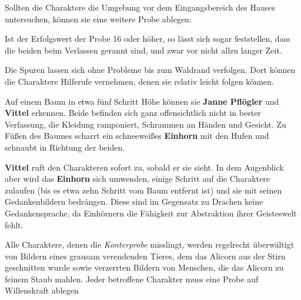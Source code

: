 Sollten die Charaktere die Umgebung vor dem Eingangsbereich des Hauses untersuchen, können sie eine weitere Probe ablegen:

Ist der Erfolgswert der Probe 16 oder höher, so lässt sich sogar feststellen, dass die beiden beim Verlassen gerannt sind, und zwar vor nicht allzu langer Zeit.

Die Spuren lassen sich ohne Probleme bis zum Waldrand verfolgen. Dort können die Charaktere Hilferufe vernehmen, denen sie relativ leicht folgen können.
\begin{center}
\end{center}

\neuespalte

Auf einem Baum in etwa fünf Schritt Höhe können sie \textbf{Janne Pflögler} und \textbf{Vittel} erkennen.
	Beide befinden sich ganz offensichtlich nicht in bester Verfassung, die Kleidung ramponiert, Schrammen an Händen und Gesicht.
	Zu Füßen des Baumes scharrt ein schneeweißes \textbf{Einhorn} mit den Hufen und schnaubt in Richtung der beiden.
	
	\textbf{Vittel} ruft den Charakteren sofort zu, sobald er sie sieht.
	In dem Augenblick aber wird das \textbf{Einhorn} sich umwenden, einige Schritt auf die Charaktere zulaufen (bis es etwa zehn Schritt vom Baum entfernt ist) und sie mit seinen Gedankenbildern bedrängen.
	Diese sind im Gegensatz zu Drachen keine Gedankensprache, da Einhörnern die Fähigkeit zur Abstraktion ihrer Geisteswelt fehlt.
 


Alle Charaktere, denen die \textit{Konterprobe} misslingt, werden  regelrecht überwältigt von Bildern eines grausam verendenden Tieres, dem das Alicorn aus der Stirn geschnitten wurde sowie verzerrten Bildern von Menschen, die das Alicorn zu feinem Staub mahlen. Jeder betroffene Charakter muss eine Probe auf Willenskraft ablegen



